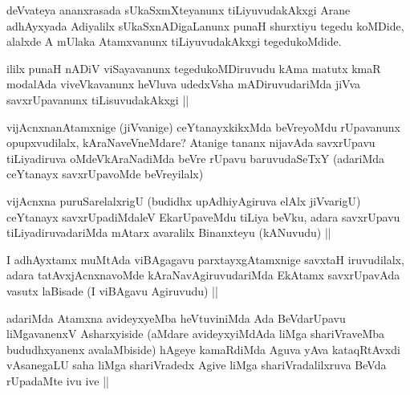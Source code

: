 \begin{artha}
deVvateya ananxrasada sUkaSxmXteyanunx tiLiyuvudakAkxgi Arane adhAyxyada Adiyalilx sUkaSxnADigaLanunx punaH shurxtiyu tegedu koMDide, alalxde A mUlaka Atamxvanunx tiLiyuvudakAkxgi tegedukoMdide.
\end{artha}


\begin{artha}
ililx punaH nADiV viSayavanunx tegedukoMDiruvudu kAma matutx kmaR modalAda viveVkavanunx heVluva udedxVsha mADiruvudariMda jiVva savxrUpavanunx tiLisuvudakAkxgi ||
\end{artha}


\begin{artha}
vijAcnxnanAtamxnige (jiVvanige) ceYtanayxkikxMda beVreyoMdu rUpavanunx opupxvudilalx, kAraNaveVneMdare? Atanige tananx nijavAda savxrUpavu tiLiyadiruva oMdeVkAraNadiMda beVre rUpavu baruvudaSeTxY (adariMda ceYtanayx savxrUpavoMde beVreyilalx)
\end{artha}

\begin{artha}
vijAcnxna puruSarelalxrigU (budidhx upAdhiyAgiruva elAlx jiVvarigU) ceYtanayx savxrUpadiMdaleV EkarUpaveMdu tiLiya beVku, adara savxrUpavu tiLiyadiruvadariMda mAtarx avaralilx Binanxteyu (kANuvudu) ||
\end{artha}


\begin{artha}
I adhAyxtamx muMtAda viBAgagavu parxtayxgAtamxnige savxtaH iruvudilalx, adara tatAvxjAcnxnavoMde kAraNavAgiruvudariMda EkAtamx savxrUpavAda vasutx laBisade (I viBAgavu Agiruvudu) ||
\end{artha}


\begin{artha}
adariMda Atamxna avideyxyeMba heVtuviniMda Ada BeVdarUpavu liMgavanenxV Asharxyiside (aMdare avideyxyiMdAda liMga shariVraveMba bududhxyanenx avalaMbiside) hAgeye kamaRdiMda Aguva yAva kataqRtAvxdi vAsanegaLU saha liMga shariVradedx Agive liMga shariVradalilxruva BeVda rUpadaMte ivu ive ||
\end{artha}


